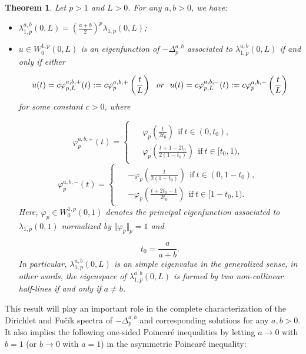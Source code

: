 \documentclass[a4paper,11pt]{article}
\newtheorem{teor}{Theorem}[section]
\begin{document}
{\begin{teor} \label{T1}
Let $p > 1$ and $L > 0$. For any $a, b > 0$, we have:

\begin{itemize}
\item[(I)] $\lambda_{1,p}^{a,b}(0,L) = \displaystyle \left(\frac{a+b}{2}\right)^{p}\lambda_{1,p}(0,L)$;
\item[(II)] $u \in W_0^{1,p}(0,L)$ is an eigenfunction of $-\Delta^{a,b}_p$ associated to $\lambda^{a,b}_{1,p}(0,L)$ if and only if either

\[
u(t) = c\varphi_{p, L}^{a,b,+}(t) := c\varphi_{p}^{a,b,+}\left(\frac{t}{L}\right)\ \ {\rm or}\ \ u(t) = c\varphi_{p, L}^{a,b,-}(t) := c\varphi_{p}^{a,b,-}\left(\frac{t}{L}\right)
\]
for some constant $c>0$, where

\begin{equation*}
\varphi_{p}^{a,b,+}(t) =
\begin{cases}
\begin{aligned}
     & \varphi_{p}\left(\frac{t}{2t_{0}}\right)\ \ \text{if} \ t \in (0,t_{0}), \\
     & \varphi_{p}\left(\frac{t + 1 - 2 t_{0}}{2(1-t_{0})}\right)\ \ \text{if} \ t \in [t_{0},1),
\end{aligned}
\end{cases}
\end{equation*}
\begin{equation*}
\varphi_{p}^{a,b,-}(t) =
\begin{cases}
\begin{aligned}
     & -\varphi_{p}\left(\frac{t}{2(1 - t_{0})}\right)\ \ \text{if} \ t \in (0,1 - t_{0}), \\
     & -\varphi_{p}\left(\frac{t + 2 t_{0} - 1}{2 t_{0}}\right)\ \ \text{if} \ t \in [1 - t_{0},1).
\end{aligned}
\end{cases}
\end{equation*}
Here, $\varphi_{p} \in W^{1,p}_0(0,1)$ denotes the principal eigenfunction associated to $\lambda_{1,p}(0,1)$ normalized by $\Vert \varphi_{p} \Vert_p = 1$ and

\[
t_{0} = \frac{a}{a+b}.
\]
In particular, $\lambda_{1,p}^{a,b}(0,L)$ is an simple eigenvalue in the generalized sense, in other words, the eigenspace of $\lambda^{a,b}_{1,p}(0,L)$ is formed by two non-collinear half-lines if and only if $a \neq b$.
\end{itemize}
\end{teor}
This result will play an important role in the complete characterization of the Dirichlet and Fu\v cík spectra of $-\Delta^{a,b}_p$ and corresponding solutions for any $a, b > 0$. It also implies the following one-sided Poincaré inequalities by letting $a \rightarrow 0$ with $b = 1$ (or $b \rightarrow 0$ with $a = 1$) in the asymmetric Poincaré inequality:

}
\end{document}
